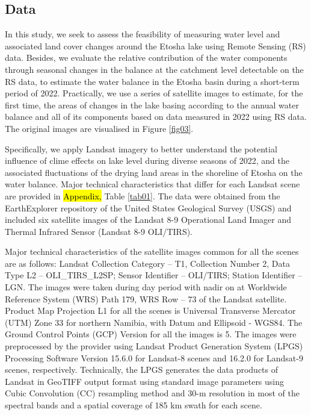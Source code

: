 \documentclass[climate,article,submit,pdftex,moreauthors]{Definitions/mdpi}
\begin{document}
\subsection{Data}
{In this study, we seek to assess the feasibility of measuring  water level and associated land cover changes around the Etosha lake using Remote Sensing (RS) data. Besides, we evaluate the relative contribution of the water components through seasonal changes in the balance at the catchment level detectable on the RS data, to estimate the water balance in the Etosha basin during a short-term period of 2022. Practically, we use a series of satellite images to estimate, for the first time, the areas of changes in the lake basing according to the annual water balance and all of its components based on data measured in 2022 using RS data.} The original images are visualised in Figure \ref{fig03}. 

{Specifically, we apply Landsat imagery to better understand the potential influence of clime effects on lake level during diverse seasons of 2022, and the associated fluctuations of the drying land areas in the shoreline of Etosha on the water balance. }Major technical characteristics that differ for each Landsat scene are provided in \hl{Appendix, }Table \ref{tab01}. The data were obtained from the EarthExplorer repository of the United States Geological Survey (USGS) and included six satellite images of the Landsat 8-9 Operational Land Imager and Thermal Infrared Sensor (Landsat 8-9 OLI/TIRS). 

Major technical characteristics of the satellite images common for all the scenes are as follows: Landsat Collection Category -- T1, Collection Number 2, Data Type L2 -- OLI\_TIRS\_L2SP; Sensor Identifier -- OLI/TIRS; Station Identifier -- LGN. The images were taken during day period with nadir on at Worldwide Reference System (WRS) Path 179, WRS Row -- 73 of the Landsat satellite. Product Map Projection L1 for all the scenes is Universal Transverse Mercator (UTM) Zone 33 for northern Namibia, with Datum and Ellipsoid - WGS84. The Ground Control Points (GCP) Version for all the images is 5. The images were preprocessed by the provider using Landsat Product Generation System (LPGS) Processing Software Version 15.6.0 for Landsat-8 scenes and 16.2.0 for Landsat-9 scenes, respectively. Technically, the LPGS generates the data products of Landsat in GeoTIFF output format using standard image parameters using Cubic Convolution (CC) resampling method and 30-m resolution in most of the spectral bands and a spatial coverage of 185 km swath for each scene. 
\end{document}
